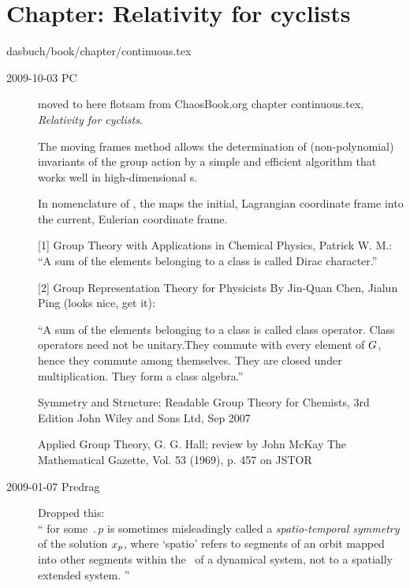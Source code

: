 \section{Chapter: Relativity for cyclists}
\label{c-continuous}
\noindent dasbuch/book/chapter/continuous.tex

\begin{description}


\item[2009-10-03 PC]
moved to here flotsam from ChaosBook.org chapter continuous.tex,
{\em Relativity for cyclists}.

The moving frames method allows the determination of (non-polynomial)
invariants of the group action by a simple and efficient
algorithm that works well in high-dim\-ens\-ion\-al \statesp s.

In nomenclature of , the {\jacobianM}
maps the initial, {Lagrangian coordinate frame} into
the current, {Eulerian coordinate frame}.


[1] Group Theory with Applications in Chemical Physics, Patrick W. M.:
``A sum of the elements belonging to a class is called Dirac character.''


[2] Group Representation Theory for Physicists
 By Jin-Quan Chen, Jialun Ping (looks nice, get it):

``A sum of the elements belonging to a class is called class operator.
Class operators need not be unitary.They commute with every element of
$G$, hence they commute among themselves.
They are closed under multiplication. They form a class algebra.''

Symmetry and Structure: Readable Group Theory for Chemists, 3rd Edition
John Wiley and Sons Ltd, Sep 2007

Applied Group Theory, G. G. Hall;
review by John McKay
The Mathematical Gazette, Vol. 53 (1969), p. 457 on JSTOR


\item[2009-01-07 Predrag] Dropped this: \\
``
 for some  $\period{p}$ is sometimes
 misleadingly called a \emph{spatio-temporal symmetry} of the
 solution $x_p$, where `spatio' refers to segments of an
 orbit mapped into other segments within the \statesp\ of a
 dynamical system, not to a spatially extended system.
 ''


\end{description}
